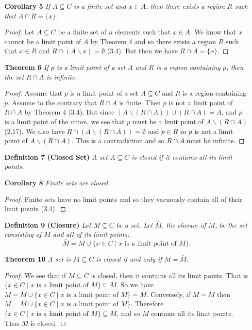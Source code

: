 \documentclass{article}
\begin{document}
\begin{flushleft}
\textbf{Corollary 5}
\textsl{If $A \subseteq C$ is a finite set and $x \in A$, then there exists a region $R$ such that $A \cap R = \{x\}$.}
\begin{proof}
Let $A \subseteq C$ be a finite set of $n$ elements such that $x \in A$. We know that $x$ cannot be a limit point of $A$ by Theorem 4 and so there exists a region $R$ such that $x \in R$ and $R \cap (A \backslash x) = \emptyset$ (3.4). But then we have $R \cap A = \{x\}$.
\end{proof}

\textbf{Theorem 6}
\textsl{If $p$ is a limit point of a set $A$ and $R$ is a region containing $p$, then the set $R \cap A$ is infinite.}
\begin{proof}
Assume that $p$ is a limit point of a set $A \subseteq C$ and $R$ is a region containing $p$. Assume to the contrary that $R \cap A$ is finite. Then $p$ is not a limit point of $R \cap A$ by Theorem 4 (3.4). But since $(A \backslash (R \cap A)) \cup (R \cap A) = A$, and $p$ is a limit point of the union, we see that $p$ must be a limit point of $A \backslash (R \cap A)$ (2.17). We also have $R \cap (A \backslash (R \cap A)) = \emptyset$ and $p \in R$ so $p$ is not a limit point of $A \backslash (R \cap A)$. This is a contradiction and so $R \cap A$ must be infinite.
\end{proof}

\textbf{Definition 7 (Closed Set)}
\textsl{A set $A \subseteq C$ is closed if it contains all its limit points.}\newline

\textbf{Corollary 8}
\textsl{Finite sets are closed.}
\begin{proof}
Finite sets have no limit points and so they vacuously contain all of their limit points (3.4).
\end{proof}

\textbf{Definition 9 (Closure)}
\textsl{Let $M \subseteq C$ be a set. Let $\overline{M}$, the closure of $M$, be the set consisting of $M$ and all of its limit points:
\[
\overline{M} = M \cup \{x \in C \mid x \text{ is a limit point of } M\}.
\]}

\textbf{Theorem 10}
\textsl{A set is $M \subseteq C$ is closed if and only if $M=\overline{M}$.}
\begin{proof}
We see that if $M \subseteq C$ is closed, then it contains all its limit points. That is $\{x \in C \mid x \text{ is a limit point of }M\} \subseteq M$. So we have $M=M \cup \{x \in C \mid x \text{ is a limit point of }M\} = \overline{M}$. Conversely, if $M=\overline{M}$ then $M = M \cup \{x \in C \mid x \text{ is a limit point of }M\}$. Therefore $\{ x \in C \mid x \text{ is a limit point of }M\} \subseteq M$, and so $M$ contains all its limit points. Thus $M$ is closed.
\end{proof}


\end{flushleft}
\end{document}
